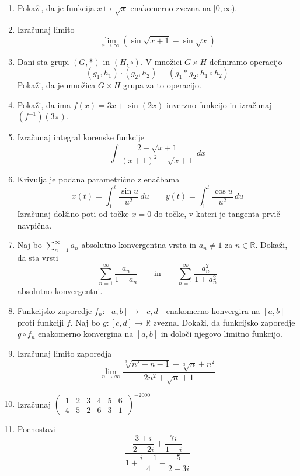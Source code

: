 \documentclass[a4paper,12pt]{article}
\newcommand{\numR}{\mathbb{R}}
\begin{document}
\begin{enumerate}
\item
Pokaži, da je funkcija $x \mapsto \sqrt{x}$ enakomerno zvezna na $[0, \infty)$.

\item
Izračunaj limito
\[
    \lim_{x \to \infty} (\sin \sqrt{x + 1} - \sin \sqrt{x})    
\]

\item
Dani sta grupi $(G,\ast)$ in $(H, \circ)$. V množici $G \times H$ definiramo operacijo
\[
    (g_1, h_1) \cdot (g_2, h_2) = (g_1 \ast g_2, h_1 \circ h_2)
\]
Pokaži, da je množica $G \times H$ grupa za to operacijo.

\item
Pokaži, da ima $f(x) = 3x + \sin(2x)$ inverzno funkcijo in izračunaj $(f^{-1})(3\pi)$.

\item
Izračunaj integral korenske funkcije
\[
    \int \frac{2 + \sqrt{x + 1}}{(x + 1)^2 - \sqrt{x + 1}}\,dx    
\]

\item
Krivulja je podana parametrično z enačbama
\[
    x(t) = \int_{1}^{t} \frac{\sin u}{u^2}\,du \qquad
    y(t) = \int_{1}^{t} \frac{\cos u}{u^2}\,du
\]
Izračunaj dolžino poti od točke $x = 0$ do točke, v kateri je tangenta prvič navpična.

\item
Naj bo $\sum_{n = 1}^{\infty} a_n$ absolutno konvergentna vrsta in $a_n \neq 1$ za $n \in \numR$.
Dokaži, da sta vrsti
\[
    \sum_{n = 1}^{\infty} \frac{a_n}{1 + a_n} \qquad \text{in} \qquad
    \sum_{n = 1}^{\infty} \frac{a_{n}^{2}}{1 + a_{n}^{2}}
\]
absolutno konvergentni.

\item
Funkcijsko zaporedje $f_n : [a, b] \to [c, d]$ enakomerno konvergira na $[a, b]$ proti
funkciji $f$. Naj bo $g : [c, d] \to \numR$ zvezna. Dokaži, da funkcijsko zaporedje
$g \circ f_n$ enakomerno konvergina na $[a, b]$ in določi njegovo limitno funkcijo.

\item
Izračunaj limito zaporedja
\[
    \lim_{n \to \infty} \frac{\sqrt[3]{n^2 + n -1} + \sqrt[3]{n} + n^2}{2n^2 + \sqrt{n} + 1}
\]

\item
Izračunaj
$
\left(\,
\begin{matrix}
    1 & 2 & 3 & 4 & 5 & 6\\
    4 & 5 & 2 & 6 & 3 & 1
\end{matrix}
\,\right)^{-2000}
$

\item
Poenostavi
\[
    \frac{
        \dfrac{3 + i}{2 - 2i} + \dfrac{7i}{1-i}
    }{
        1 + \dfrac{i-1}{4} - \dfrac{5}{2-3i}
    }    
\]


\end{enumerate}
\end{document}
